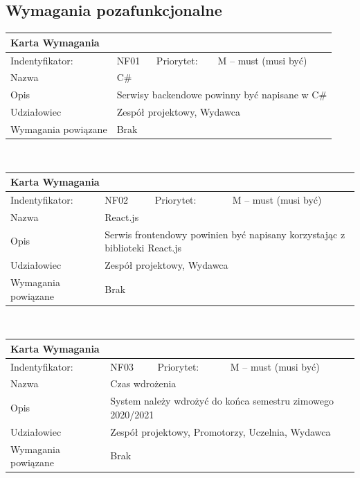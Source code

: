 \documentclass[a4paper,11pt]{report}
\begin{document}
	\subsection {Wymagania pozafunkcjonalne}
	\begin{tabular}{|p{3cm}|p{2cm}|p{2cm}|p{6cm}|}
		\hline
		\multicolumn{4}{|p{12 cm}|}{Karta Wymagania}\\
		\hline
		Indentyfikator: & NF01 & Priorytet: & M – must (musi być)\\
		\hline
		Nazwa & \multicolumn{3}{|p{10 cm}|}{C\#}\\
		\hline
		Opis & \multicolumn{3}{|p{10 cm}|}{Serwisy backendowe powinny być napisane w C\#}\\
		\hline
		Udziałowiec & \multicolumn{3}{|p{10 cm}|}{Zespół projektowy, Wydawca}\\
		\hline
		Wymagania powiązane & \multicolumn{3}{|p{10 cm}|}{Brak}\\
		\hline
		\end{tabular}\\
		\begin{tabular}{|p{3cm}|p{2cm}|p{2cm}|p{6cm}|}
		\hline
		\multicolumn{4}{|p{12 cm}|}{Karta Wymagania}\\
		\hline
		Indentyfikator: & NF02 & Priorytet: & M – must (musi być)\\
		\hline
		Nazwa & \multicolumn{3}{|p{10 cm}|}{React.js}\\
		\hline
		Opis & \multicolumn{3}{|p{10 cm}|}{Serwis frontendowy powinien być napisany korzystając z biblioteki React.js}\\
		\hline
		Udziałowiec & \multicolumn{3}{|p{10 cm}|}{Zespół projektowy, Wydawca}\\
		\hline
		Wymagania powiązane & \multicolumn{3}{|p{10 cm}|}{Brak}\\
		\hline
		\end{tabular}\\
		\begin{tabular}{|p{3cm}|p{2cm}|p{2cm}|p{6cm}|}
		\hline
		\multicolumn{4}{|p{12 cm}|}{Karta Wymagania}\\
		\hline
		Indentyfikator: & NF03 & Priorytet: & M – must (musi być)\\
		\hline
		Nazwa & \multicolumn{3}{|p{10 cm}|}{Czas wdrożenia }\\
		\hline
		Opis & \multicolumn{3}{|p{10 cm}|}{System należy wdrożyć do końca semestru zimowego 2020/2021}\\
		\hline
		Udziałowiec & \multicolumn{3}{|p{10 cm}|}{Zespół projektowy, Promotorzy, Uczelnia, Wydawca}\\
		\hline
		Wymagania powiązane & \multicolumn{3}{|p{10 cm}|}{Brak}\\
		\hline
		\end{tabular}\\
\end{document}
